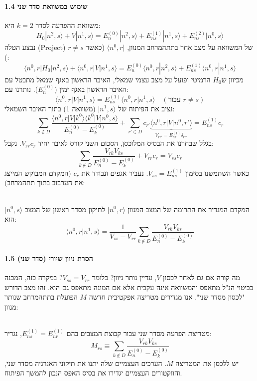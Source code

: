 \paragraph{1.4 שימוש במשוואת סדר שני}
משוואת ההפרעה לסדר $k=2$ היא:
\[ H_0 |n^2, s\rangle + V |n^1, s\rangle = E_n^{(0)} |n^2, s\rangle + E_{ns}^{(1)} |n^1, s\rangle + E_{ns}^{(2)} |n^0, s\rangle \]
נבצע הטלה (Project) של המשוואה על מצב אחר בתתהמרחב המנוון, $\langle n^0, r|$ (כאשר $r \neq s$):
\[ \langle n^0, r | H_0 | n^2, s\rangle + \langle n^0, r | V | n^1, s\rangle = E_n^{(0)} \langle n^0, r | n^2, s\rangle + E_{ns}^{(1)} \langle n^0, r | n^1, s\rangle \]
מכיוון ש$H_0$ הרמיטי ופועל על מצב עצמי שמאלי, האיבר הראשון באגף שמאל מתבטל עם האיבר הראשון באגף ימין ($E_n^{(0)}$). נותרנו עם:
\[ \langle n^0, r | V | n^1, s\rangle = E_{ns}^{(1)} \langle n^0, r | n^1, s\rangle \quad (\text{עבור } r \neq s) \]
נציב את הפיתוח של $|n^1, s\rangle$ (משוואה 1) בתוך האיבר השמאלי:
\[ \sum_{k \notin D} \frac{\langle n^0, r | V | k^0 \rangle \langle k^0 | V | n^0, s \rangle}{E_n^{(0)} - E_k^{(0)}} + \sum_{r' \in D} c_{r'} \underbrace{\langle n^0, r | V | n^0, r' \rangle}_{V_{rr'} = E_{nr}^{(1)}\delta_{rr'}} = E_{ns}^{(1)} c_r \]
בגלל שבחרנו את הבסיס המלוכסן, הסכום השני קורס לאיבר יחיד $V_{rr} c_r$. נקבל:
\[ \sum_{k \notin D} \frac{V_{rk} V_{ks}}{E_n^{(0)} - E_k^{(0)}} + V_{rr} c_r = V_{ss} c_r \]
כאשר השתמשנו בסימון $V_{ss} = E_{ns}^{(1)}$. נעביר אגפים ונבודד את $c_r$ (המקדם המבוקש המייצג את הערבוב בתוך תתהמרחב):

\begin{resultbox}
\\
המקדם המגדיר את התרומה של המצב המנוון $|n^0, r\rangle$ לתיקון מסדר ראשון של המצב $|n^0, s\rangle$ הוא:
\[ \langle n^0, r | n^1, s\rangle = \frac{1}{V_{ss} - V_{rr}} \sum_{k \notin D} \frac{V_{rk} V_{ks}}{E_n^{(0)} - E_k^{(0)}} \]
\end{resultbox}

\paragraph{1.5 הסרת ניוון שיורי (סדר שני)}
מה קורה אם גם לאחר לכסון $V$, עדיין נותר ניוון? כלומר $V_{ss} = V_{rr}$?
במקרה כזה, המכנה בביטוי הנ"ל מתאפס והמשוואה אינה עקבית אלא אם המונה מתאפס גם הוא.
זהו מצב הדורש "לכסון מסדר שני". אנו מגדירים מטריצה אפקטיבית חדשה $M$ הפועלת בתתהמרחב שנותר מנוון:

\begin{definitionbox} 
\\
מטריצת הפרעה מסדר שני
עבור קבוצת המצבים בהם $E_{ns}^{(1)} = E_{nr}^{(1)}$, נגדיר:
\[ M_{rs} \equiv \sum_{k \notin D} \frac{V_{rk} V_{ks}}{E_n^{(0)} - E_k^{(0)}} \]
יש ללכסן את המטריצה $M$. הערכים העצמיים שלה יתנו את תיקוני האנרגיה מסדר שני, והווקטורים העצמיים יגדירו את בסיס האפס הנכון להמשך הפיתוח.
\end{definitionbox}



